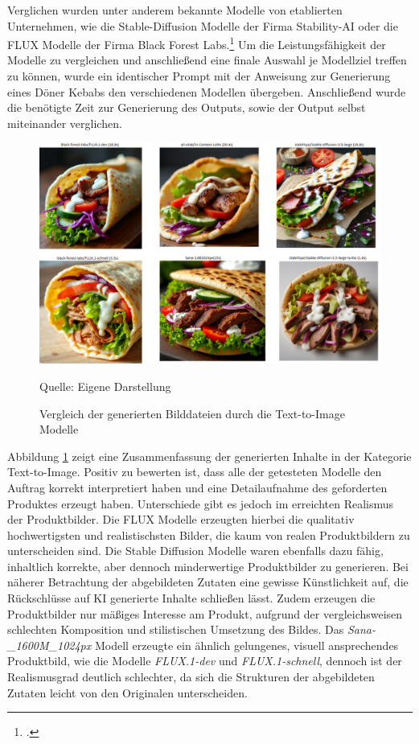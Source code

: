 Verglichen wurden unter anderem bekannte Modelle von etablierten Unternehmen, wie die Stable-Diffusion Modelle der Firma Stability-AI oder die FLUX Modelle der Firma Black Forest Labs.\footcite{stabilityai,blackforestlabs}
Um die Leistungsfähigkeit der Modelle zu vergleichen und anschließend eine finale Auswahl je Modellziel treffen zu können, wurde ein identischer Prompt mit der Anweisung zur Generierung eines Döner Kebabs den verschiedenen Modellen übergeben.
Anschließend wurde die benötigte Zeit zur Generierung des Outputs, sowie der Output selbst miteinander verglichen.

\begin{figure}[h]
    \centering
    \includegraphics[width=\textwidth]{abbildungen/Results_image_generation}
    \caption{Vergleich der generierten Bilddateien durch die Text-to-Image Modelle}
    \label{fig:results_image_generation}
    \raggedright Quelle: Eigene Darstellung
\end{figure}

Abbildung \ref{fig:results_image_generation} zeigt eine Zusammenfassung der generierten Inhalte in der Kategorie Text-to-Image.
Positiv zu bewerten ist, dass alle der getesteten Modelle den Auftrag korrekt interpretiert haben und eine Detailaufnahme des geforderten Produktes erzeugt haben.
Unterschiede gibt es jedoch im erreichten Realismus der Produktbilder.
Die FLUX Modelle erzeugten hierbei die qualitativ hochwertigsten und realistischsten Bilder, die kaum von realen Produktbildern zu unterscheiden sind.
Die Stable Diffusion Modelle waren ebenfalls dazu fähig, inhaltlich korrekte, aber dennoch minderwertige Produktbilder zu generieren.
Bei näherer Betrachtung der abgebildeten Zutaten eine gewisse Künstlichkeit auf, die Rückschlüsse auf \ac{KI} generierte Inhalte schließen lässt.
Zudem erzeugen die Produktbilder nur mäßiges Interesse am Produkt, aufgrund der vergleichsweisen schlechten Komposition und stilistischen Umsetzung des Bildes.
Das \textit{Sana-\_1600M\_1024px} Modell erzeugte ein ähnlich gelungenes, visuell ansprechendes Produktbild, wie die Modelle \textit{FLUX.1-dev} und \textit{FLUX.1-schnell}, dennoch ist der Realismusgrad deutlich schlechter, da sich die Strukturen der abgebildeten Zutaten leicht von den Originalen unterscheiden.

